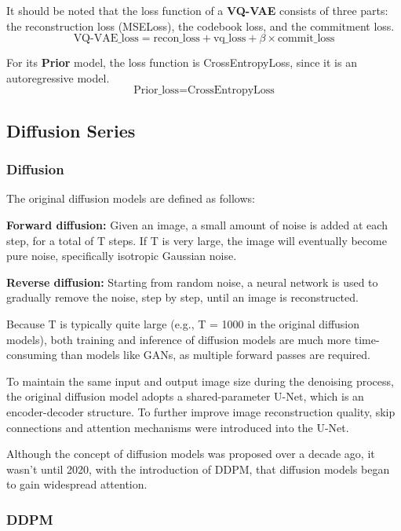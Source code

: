 \documentclass{article}
\begin{document}
It should be noted that the loss function of a \textbf{VQ-VAE} consists of three parts: the reconstruction 
loss (MSELoss), the codebook loss, and the commitment loss.
\begin{equation}
\text{VQ-VAE\_loss} = \text{recon\_loss} + \text{vq\_loss} + \beta \times \text{commit\_loss}
\end{equation}

For its \textbf{Prior} model, the loss function is CrossEntropyLoss, since it is an autoregressive model.
\begin{equation}
\text{Prior\_loss} = \text{CrossEntropyLoss}
\end{equation}

\subsection{Diffusion Series}

\subsubsection{Diffusion}

The original diffusion models are defined as follows:

\textbf{Forward diffusion:} Given an image, a small amount of noise is added at each step, for a total of T 
steps. If T is very large, the image will eventually become pure noise, specifically isotropic Gaussian 
noise.

\textbf{Reverse diffusion:} Starting from random noise, a neural network is used to gradually remove the 
noise, step by step, until an image is reconstructed.

Because T is typically quite large (e.g., T = 1000 in the original diffusion models), both training and 
inference of diffusion models are much more time-consuming than models like GANs, as multiple forward passes 
are required.

To maintain the same input and output image size during the denoising process, the original diffusion model 
adopts a shared-parameter U-Net, which is an encoder-decoder structure. To further improve image 
reconstruction quality, skip connections and attention mechanisms were introduced into the U-Net.

Although the concept of diffusion models was proposed over a decade ago, it wasn't until 2020, with the 
introduction of DDPM, that diffusion models began to gain widespread attention.

\subsubsection{DDPM}
\end{document}
